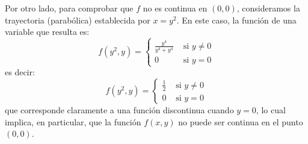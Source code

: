 Por otro lado, para comprobar que $f$ no es continua en $(0,0)$, consideramos la trayectoria (parabólica) establecida por $x=y^{2}$. En este caso, la función de una variable que resulta es:
$$
    f\left(y^{2}, y\right)= \begin{cases}\frac{y^{4}}{y^{4}+y^{4}} & \text { si } y \neq 0 \\ 0 & \text { si } y=0\end{cases}
$$
es decir:
$$
    f\left(y^{2}, y\right)= \begin{cases}\frac{1}{2} & \text { si } y \neq 0 \\ 0 & \text { si } y=0\end{cases}
$$
que corresponde claramente a una función discontinua cuando $y=0$, lo cual implica, en particular, que la función $f(x, y)$ no puede ser continua en el punto $(0,0)$.